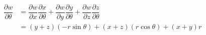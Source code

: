 \documentclass[runningheads]{llncs}
\begin{document}
\begin{align*}
	\dfrac{\partial w}{\partial \theta}
	&= \dfrac{\partial w}{\partial x}\dfrac{\partial x}{\partial \theta}
		 + \dfrac{\partial w}{\partial y}\dfrac{\partial y}{\partial \theta}
		 + \dfrac{\partial w}{\partial z}\dfrac{\partial z}{\partial \theta}\\
	&= \left(y+z\right)\left(-r\sin\theta\right)+\left(x+z\right)\left(r\cos\theta\right)+\left(x+y\right)r
\end{align*}
\end{document}
